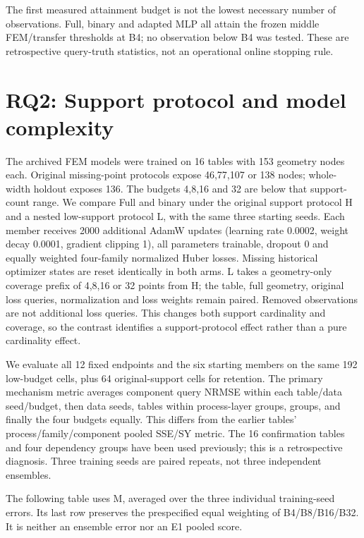 \documentclass[10pt,twocolumn]{article}
\begin{document}
The first measured attainment budget is not the lowest necessary number of observations. Full, binary and adapted MLP all attain the frozen middle FEM/transfer thresholds at B4; no observation below B4 was tested. These are retrospective query-truth statistics, not an operational online stopping rule.

\section*{RQ2: Support protocol and model complexity}

The archived FEM models were trained on 16 tables with 153 geometry nodes each. Original missing-point protocols expose 46,77,107 or 138 nodes; whole-width holdout exposes 136. The budgets 4,8,16 and 32 are below that support-count range. We compare Full and binary under the original support protocol H and a nested low-support protocol L, with the same three starting seeds. Each member receives 2000 additional AdamW updates (learning rate 0.0002, weight decay 0.0001, gradient clipping 1), all parameters trainable, dropout 0 and equally weighted four-family normalized Huber losses. Missing historical optimizer states are reset identically in both arms. L takes a geometry-only coverage prefix of 4,8,16 or 32 points from H; the table, full geometry, original loss queries, normalization and loss weights remain paired. Removed observations are not additional loss queries. This changes both support cardinality and coverage, so the contrast identifies a support-protocol effect rather than a pure cardinality effect.

We evaluate all 12 fixed endpoints and the six starting members on the same 192 low-budget cells, plus 64 original-support cells for retention. The primary mechanism metric averages component query NRMSE within each table/data seed/budget, then data seeds, tables within process-layer groups, groups, and finally the four budgets equally. This differs from the earlier tables' process/family/component pooled SSE/SY metric. The 16 confirmation tables and four dependency groups have been used previously; this is a retrospective diagnosis. Three training seeds are paired repeats, not three independent ensembles.



The following table uses M, averaged over the three individual training-seed errors. Its last row preserves the prespecified equal weighting of B4/B8/B16/B32. It is neither an ensemble error nor an E1 pooled score.
\end{document}
